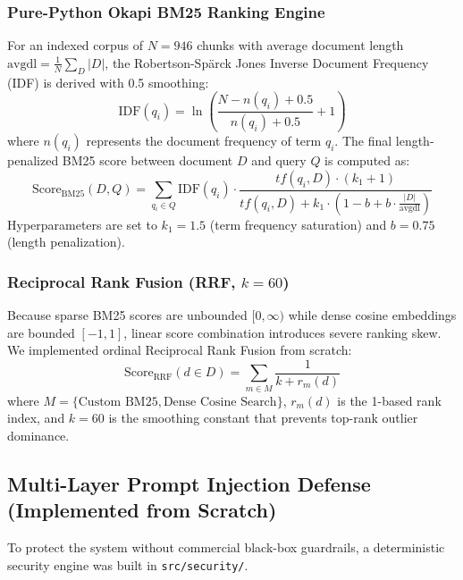 \documentclass[conference]{IEEEtran}
\begin{document}
\subsubsection{Pure-Python Okapi BM25 Ranking Engine}
For an indexed corpus of $N=946$ chunks with average document length $\text{avgdl} = \frac{1}{N} \sum_{D} |D|$, the Robertson-Sp\"arck Jones Inverse Document Frequency (IDF) is derived with 0.5 smoothing:
\begin{equation}
\text{IDF}(q_i) = \ln \left( \frac{N - n(q_i) + 0.5}{n(q_i) + 0.5} + 1 \right)
\end{equation}
where $n(q_i)$ represents the document frequency of term $q_i$. The final length-penalized BM25 score between document $D$ and query $Q$ is computed as:
\begin{equation}
\text{Score}_{\text{BM25}}(D, Q) = \sum_{q_i \in Q} \text{IDF}(q_i) \cdot \frac{tf(q_i, D) \cdot (k_1 + 1)}{tf(q_i, D) + k_1 \cdot \left( 1 - b + b \cdot \frac{|D|}{\text{avgdl}} \right)}
\end{equation}
Hyperparameters are set to $k_1 = 1.5$ (term frequency saturation) and $b = 0.75$ (length penalization).

\subsubsection{Reciprocal Rank Fusion (RRF, $k=60$)}
Because sparse BM25 scores are unbounded $[0, \infty)$ while dense cosine embeddings are bounded $[-1, 1]$, linear score combination introduces severe ranking skew. We implemented ordinal Reciprocal Rank Fusion from scratch:
\begin{equation}
\text{Score}_{\text{RRF}}(d \in D) = \sum_{m \in M} \frac{1}{k + r_m(d)}
\end{equation}
where $M = \{\text{Custom BM25}, \text{Dense Cosine Search}\}$, $r_m(d)$ is the 1-based rank index, and $k = 60$ is the smoothing constant that prevents top-rank outlier dominance.

\subsection{Multi-Layer Prompt Injection Defense (Implemented from Scratch)}
To protect the system without commercial black-box guardrails, a deterministic security engine was built in \texttt{src/security/}.
\end{document}
